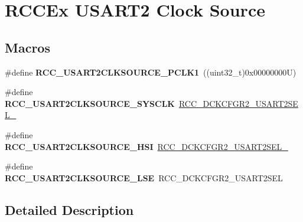 \hypertarget{group___r_c_c_ex___u_s_a_r_t2___clock___source}{}\section{R\+C\+C\+Ex U\+S\+A\+R\+T2 Clock Source}
\label{group___r_c_c_ex___u_s_a_r_t2___clock___source}
\subsection*{Macros}
\begin{DoxyCompactItemize}
\item 
\mbox{\label{group___r_c_c_ex___u_s_a_r_t2___clock___source_gab289cffbef2f41c7df1866d7da23e8ec}} 
\#define {\bfseries R\+C\+C\+\_\+\+U\+S\+A\+R\+T2\+C\+L\+K\+S\+O\+U\+R\+C\+E\+\_\+\+P\+C\+L\+K1}~((uint32\+\_\+t)0x00000000\+U)
\item 
\mbox{\label{group___r_c_c_ex___u_s_a_r_t2___clock___source_gab06c008b4b6015e3a13fbbdbfe8d0121}} 
\#define {\bfseries R\+C\+C\+\_\+\+U\+S\+A\+R\+T2\+C\+L\+K\+S\+O\+U\+R\+C\+E\+\_\+\+S\+Y\+S\+C\+LK}~\mbox{\hyperlink{group___peripheral___registers___bits___definition_ga035fad6759054c3c736f36364af7026b}{R\+C\+C\+\_\+\+D\+C\+K\+C\+F\+G\+R2\+\_\+\+U\+S\+A\+R\+T2\+S\+E\+L\+\_}}
\item 
\mbox{\label{group___r_c_c_ex___u_s_a_r_t2___clock___source_gae2ca7c150d24aa19b3cdfff9859872fc}} 
\#define {\bfseries R\+C\+C\+\_\+\+U\+S\+A\+R\+T2\+C\+L\+K\+S\+O\+U\+R\+C\+E\+\_\+\+H\+SI}~\mbox{\hyperlink{group___peripheral___registers___bits___definition_gad25c640f5f8ddff851fc26c9bc4984a6}{R\+C\+C\+\_\+\+D\+C\+K\+C\+F\+G\+R2\+\_\+\+U\+S\+A\+R\+T2\+S\+E\+L\+\_}}
\item 
\mbox{\label{group___r_c_c_ex___u_s_a_r_t2___clock___source_gae95fa6fc4e888e6ea48d8f83ea4c0f4b}} 
\#define {\bfseries R\+C\+C\+\_\+\+U\+S\+A\+R\+T2\+C\+L\+K\+S\+O\+U\+R\+C\+E\+\_\+\+L\+SE}~R\+C\+C\+\_\+\+D\+C\+K\+C\+F\+G\+R2\+\_\+\+U\+S\+A\+R\+T2\+S\+EL
\end{DoxyCompactItemize}


\subsection{Detailed Description}
